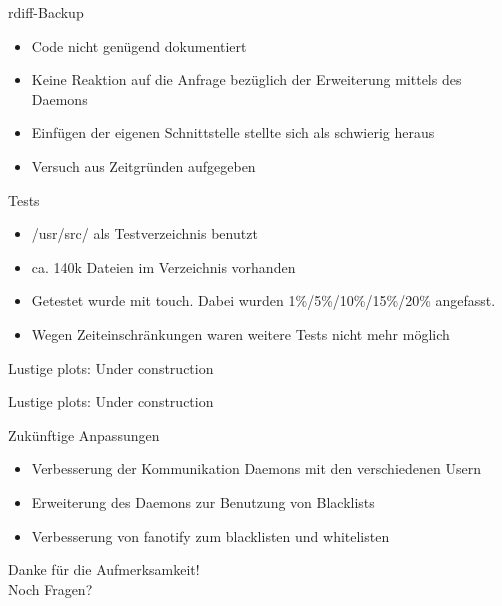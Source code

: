 \documentclass{beamer}
\begin{document}
\begin{frame}{rdiff-Backup}
  \begin{itemize}
    \item
      Code nicht gen\"ugend dokumentiert
    \item
      Keine Reaktion auf die Anfrage bez\"uglich der Erweiterung mittels des
      Daemons
    \item
      Einf\"ugen der eigenen Schnittstelle stellte sich als schwierig heraus
    \item
      Versuch aus Zeitgr\"unden aufgegeben
  \end{itemize}
\end{frame}

\begin{frame}{Tests}
\begin{itemize}
  \item
    /usr/src/ als Testverzeichnis benutzt
  \item
    ca. 140k Dateien im Verzeichnis vorhanden
  \item
    Getestet wurde mit touch. Dabei wurden 1\%/5\%/10\%/15\%/20\% angefasst.
  \item
    Wegen Zeiteinschr\"ankungen waren weitere Tests nicht mehr m\"oglich
\end{itemize}
\end{frame}

\begin{frame}
  Lustige plots: Under construction
\end{frame}

\begin{frame}
  Lustige plots: Under construction
\end{frame}

\begin{frame}{Zuk\"unftige Anpassungen}
  \begin{itemize}
    \item
      Verbesserung der Kommunikation Daemons mit den verschiedenen Usern
    \item
      Erweiterung des Daemons zur Benutzung von Blacklists
    \item
      Verbesserung von fanotify zum blacklisten und whitelisten
  \end{itemize}
\end{frame}

\begin{frame}
  \begin{center}
  \huge{Danke f\"ur die Aufmerksamkeit!}\\
  \huge{Noch Fragen?}
\end{center}
\end{frame}
\end{document}

